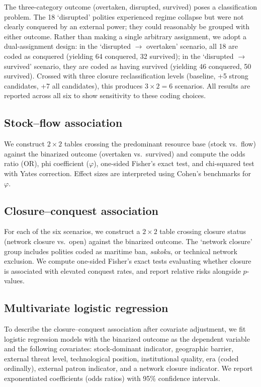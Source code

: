 \documentclass[pdflatex,sn-basic]{sn-jnl}
\theoremstyle{thmstyleone}%
\theoremstyle{thmstyletwo}%
\theoremstyle{thmstylethree}%
\begin{document}
The three-category outcome (overtaken, disrupted, survived) poses a classification problem. The 18 `disrupted' polities experienced regime collapse but were not clearly conquered by an external power; they could reasonably be grouped with either outcome. Rather than making a single arbitrary assignment, we adopt a dual-assignment design: in the `disrupted $\to$ overtaken' scenario, all 18 are coded as conquered (yielding 64 conquered, 32 survived); in the `disrupted $\to$ survived' scenario, they are coded as having survived (yielding 46 conquered, 50 survived). Crossed with three closure reclassification levels (baseline, +5 strong candidates, +7 all candidates), this produces $3 \times 2 = 6$ scenarios. All results are reported across all six to show sensitivity to these coding choices.

\subsection{Stock--flow association}\label{sec:methods-stockflow}

We construct $2 \times 2$ tables crossing the predominant resource base (stock vs.\ flow) against the binarized outcome (overtaken vs.\ survived) and compute the odds ratio (OR), phi coefficient ($\varphi$), one-sided Fisher's exact test, and chi-squared test with Yates correction. Effect sizes are interpreted using Cohen's benchmarks for $\varphi$.

\subsection{Closure--conquest association}\label{sec:methods-closure}

For each of the six scenarios, we construct a $2 \times 2$ table crossing closure status (network closure vs.\ open) against the binarized outcome. The `network closure' group includes polities coded as maritime ban, \emph{sakoku}, or technical network exclusion. We compute one-sided Fisher's exact tests evaluating whether closure is associated with elevated conquest rates, and report relative risks alongside $p$-values.

\subsection{Multivariate logistic regression}\label{sec:methods-logistic}

To describe the closure--conquest association after covariate adjustment, we fit logistic regression models with the binarized outcome as the dependent variable and the following covariates: stock-dominant indicator, geographic barrier, external threat level, technological position, institutional quality, era (coded ordinally), external patron indicator, and a network closure indicator. We report exponentiated coefficients (odds ratios) with 95\% confidence intervals.
\end{document}
